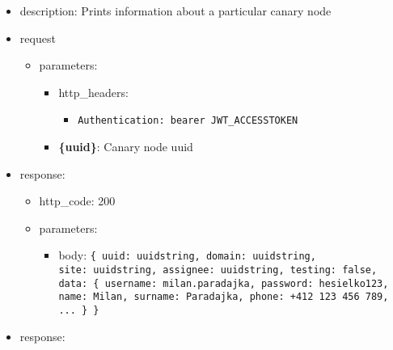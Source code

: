 \documentclass[
]{article}
\begin{document}
\begin{itemize}
\item
  description: Prints information about a particular canary node
\item
  request

  \begin{itemize}
  \item
    parameters:

    \begin{itemize}
    \item
      http\_headers:

      \begin{itemize}
      \item
        \texttt{Authentication:\ \textquotesingle{}bearer\ JWT\_ACCESSTOKEN\textquotesingle{}}
      \end{itemize}
    \item
      \textbf{\{uuid\}}: Canary node uuid
    \end{itemize}
  \end{itemize}
\item
  response:

  \begin{itemize}
  \item
    http\_code: 200
  \item
    parameters:

    \begin{itemize}
    \item
      body: \texttt{\{
      \textquotesingle{}uuid\textquotesingle{}:\ \textquotesingle{}uuidstring\textquotesingle{},
      \textquotesingle{}domain\textquotesingle{}:\ \textquotesingle{}uuidstring\textquotesingle{},
      \textquotesingle{}site\textquotesingle{}:\ \textquotesingle{}uuidstring\textquotesingle{},
      \textquotesingle{}assignee\textquotesingle{}:\ \textquotesingle{}uuidstring\textquotesingle{},
      \textquotesingle{}testing\textquotesingle{}:\ false,
      \textquotesingle{}data\textquotesingle{}:\ \{
      	\textquotesingle{}username\textquotesingle{}:\ \textquotesingle{}milan.paradajka\textquotesingle{},
      	\textquotesingle{}password\textquotesingle{}:\ \textquotesingle{}hesielko123\textquotesingle{},
      	\textquotesingle{}name\textquotesingle{}:\ \textquotesingle{}Milan\textquotesingle{},
      	\textquotesingle{}surname\textquotesingle{}:\ \textquotesingle{}Paradajka\textquotesingle{},
      	\textquotesingle{}phone\textquotesingle{}:\ \textquotesingle{}+412\ 123\ 456\ 789\textquotesingle{},
      	...
      \}
      \}}
    \end{itemize}
  \end{itemize}
\item
  response:


\end{itemize}
\end{document}
